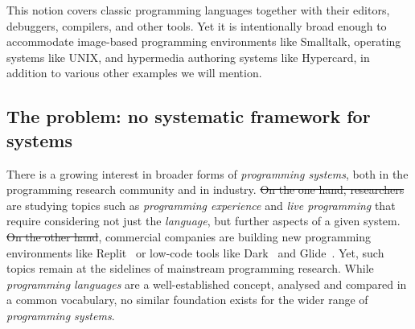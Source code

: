 \documentclass[english,submission]{programming}
\providecommand{\DIFadd}[1]{{\protect\color{blue}\uwave{#1}}} %
\providecommand{\DIFdel}[1]{{\protect\color{red}\sout{#1}}}                      %
\providecommand{\DIFaddbegin}{} %
\providecommand{\DIFaddend}{} %
\providecommand{\DIFdelbegin}{} %
\providecommand{\DIFdelend}{} %
\begin{document}
\DIFaddend This notion covers classic programming languages together with their
editors, debuggers, compilers, and other tools. Yet it is intentionally
broad enough to accommodate image-based programming environments like
Smalltalk, operating systems like UNIX, and hypermedia authoring systems
like Hypercard, in addition to various other examples we will mention.

\DIFdelbegin %
\DIFdelend \DIFaddbegin \hypertarget{the-problem-no-systematic-framework-for-systems}{%
\subsection{The problem: no systematic framework for
systems}\label{the-problem-no-systematic-framework-for-systems}}
\DIFaddend 

There is a growing interest in broader forms of \emph{programming
systems}, both in the programming research community and in industry.
\DIFdelbegin \DIFdel{On
the one hand, researchers }\DIFdelend \DIFaddbegin \DIFadd{Researchers }\DIFaddend are studying topics such as \emph{programming experience}
and \emph{live programming} that require considering not just the
\emph{language}, but further aspects of a given system. \DIFdelbegin \DIFdel{On the other hand}\DIFdelend \DIFaddbegin \DIFadd{At the same
time}\DIFaddend , commercial companies are building new programming environments
like Replit~\cite{ReplitWeb} or low-code tools like Dark~\cite{DarkWeb}
and Glide~\cite{GlideWeb}. Yet, such topics remain at the sidelines of
mainstream programming research. While \emph{programming languages} are
a well-established concept, analysed and compared in a common
vocabulary, no similar foundation exists for the wider range of
\emph{programming systems}.
\end{document}
